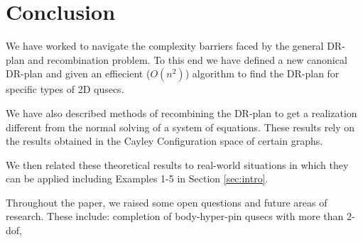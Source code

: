 \section{Conclusion}
We have worked to navigate the complexity barriers faced by the general DR-plan and recombination problem. To this end we have defined a new canonical DR-plan and given an effiecient ($O(n^2)$) algorithm to find the DR-plan for specific types of 2D qusecs.

We have also described methods of recombining the DR-plan to get a realization different from the normal solving of a system of equations. These results rely on the results obtained in the Cayley Configuration space of certain graphs. 

We then related these theoretical results to real-world situations in which they can be applied including Examples 1-5 in Section \ref{sec:intro}. 

Throughout the paper, we raised some open questions and future areas of research. These include: completion of body-hyper-pin qusecs with more than 2-dof, 